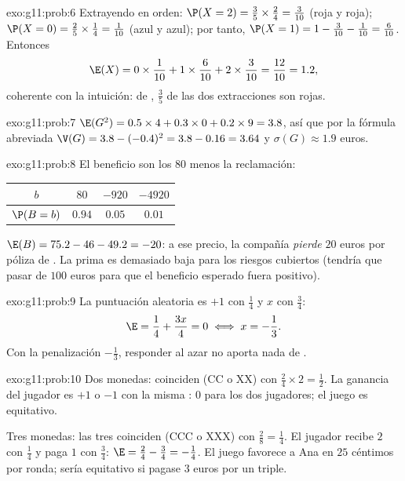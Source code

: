 \begin{solution}{exo:g11:prob:6}
Extrayendo en orden: $\P(X = 2) = \frac35 \times \frac24 = \frac{3}{10}$
(roja y roja); $\P(X = 0) = \frac25 \times \frac14 = \frac{1}{10}$ (azul y
azul); por tanto,
$\P(X = 1) = 1 - \frac{3}{10} - \frac{1}{10} = \frac{6}{10}$. Entonces
\[
\E(X) = 0 \times \frac1{10} + 1 \times \frac6{10} + 2 \times \frac3{10}
= \frac{12}{10} = 1.2 ,
\]
coherente con la intuición: de , $\frac35$ de las dos extracciones
son rojas.
\end{solution}

\begin{solution}{exo:g11:prob:7}
$\E(G^2) = 0.5 \times 4 + 0.3 \times 0 + 0.2 \times 9 = 3.8$, así que por
la fórmula abreviada $\V(G) = 3.8 - (-0.4)^2 = 3.8 - 0.16 = 3.64$ y
$\sigma(G) \approx 1.9$ euros.
\end{solution}

\begin{solution}{exo:g11:prob:8}
El beneficio son los $80$ menos la reclamación:
\begin{center}
\begin{tabular}{c|ccc}
$b$ & $80$ & $-920$ & $-4920$\\
\hline
$\P(B=b)$ & $0.94$ & $0.05$ & $0.01$
\end{tabular}
\end{center}
$\E(B) = 75.2 - 46 - 49.2 = -20$: a ese precio, la compañía \emph{pierde}
$20$ euros por póliza de . La prima es demasiado baja para los
riesgos cubiertos (tendría que pasar de $100$ euros para que el beneficio
esperado fuera positivo).
\end{solution}

\begin{solution}{exo:g11:prob:9}
La puntuación aleatoria es $+1$ con  $\frac14$ y $x$ con
 $\frac34$:
\[
\E = \frac14 + \frac{3x}{4} = 0 \iff x = -\frac13 .
\]
Con la penalización $-\frac13$, responder al azar no aporta nada de
.
\end{solution}

\begin{solution}{exo:g11:prob:10}
Dos monedas: coinciden (CC o XX) con 
$\frac24 \times 2 = \frac12$. La ganancia del jugador es $+1$ o $-1$ con
la misma :  $0$ para los dos jugadores; el juego es
equitativo.

Tres monedas: las tres coinciden (CCC o XXX) con 
$\frac{2}{8} = \frac14$. El jugador recibe $2$ con  $\frac14$
y paga $1$ con  $\frac34$:
$\E = \frac24 - \frac34 = -\frac14$. El juego favorece a Ana en $25$
céntimos por ronda; sería equitativo si pagase $3$ euros por un triple.
\end{solution}

